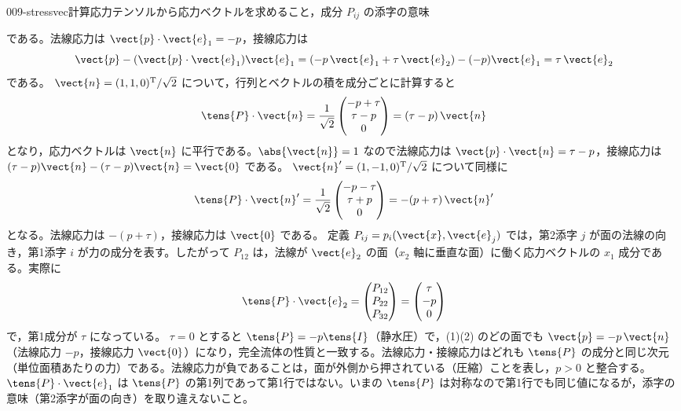 \documentclass[uplatex,dvipdfmx,a4paper,11pt]{jsarticle}
\begin{document}
\begin{mondai}{009-stressvec}{計算}{応力テンソルから応力ベクトルを求めること，成分 $P_{ij}$ の添字の意味}
\begin{tadashii}
である。法線応力は $\vect{p}\cdot\vect{e}_1=-p$，接線応力は
\[ \vect{p}-(\vect{p}\cdot\vect{e}_1)\vect{e}_1=(-p\,\vect{e}_1+\tau\,\vect{e}_2)-(-p)\vect{e}_1=\tau\,\vect{e}_2 \]
である。
 $\vect{n}=(1,1,0)^{\mathrm{T}}/\sqrt{2}$ について，行列とベクトルの積を成分ごとに計算すると
\[ \tens{P}\cdot\vect{n}=\frac{1}{\sqrt{2}}\begin{pmatrix}-p+\tau\\ \tau-p\\ 0\end{pmatrix}=(\tau-p)\,\vect{n} \]
となり，応力ベクトルは $\vect{n}$ に平行である。$\abs{\vect{n}}=1$ なので法線応力は $\vect{p}\cdot\vect{n}=\tau-p$，接線応力は $(\tau-p)\vect{n}-(\tau-p)\vect{n}=\vect{0}$ である。
$\vect{n}'=(1,-1,0)^{\mathrm{T}}/\sqrt{2}$ について同様に
\[ \tens{P}\cdot\vect{n}'=\frac{1}{\sqrt{2}}\begin{pmatrix}-p-\tau\\ \tau+p\\ 0\end{pmatrix}=-(p+\tau)\,\vect{n}' \]
となる。法線応力は $-(p+\tau)$，接線応力は $\vect{0}$ である。
 定義  $P_{ij}=p_i(\vect{x},\vect{e}_j)$ では，第2添字 $j$ が面の法線の向き，第1添字 $i$ が力の成分を表す。したがって $P_{12}$ は，法線が $\vect{e}_2$ の面（$x_2$ 軸に垂直な面）に働く応力ベクトルの $x_1$ 成分である。実際に
\[ \tens{P}\cdot\vect{e}_2=\begin{pmatrix}P_{12}\\ P_{22}\\ P_{32}\end{pmatrix}=\begin{pmatrix}\tau\\ -p\\ 0\end{pmatrix} \]
で，第1成分が $\tau$ になっている。
\kenzan $\tau=0$ とすると $\tens{P}=-p\tens{I}$（静水圧）で，(1)(2) のどの面でも $\vect{p}=-p\,\vect{n}$（法線応力 $-p$，接線応力 $\vect{0}$）になり，完全流体の性質と一致する。法線応力・接線応力はどれも $\tens{P}$ の成分と同じ次元（単位面積あたりの力）である。法線応力が負であることは，面が外側から押されている（圧縮）ことを表し，$p>0$ と整合する。
\tsumazuki $\tens{P}\cdot\vect{e}_1$ は $\tens{P}$ の第1列であって第1行ではない。いまの $\tens{P}$ は対称なので第1行でも同じ値になるが，添字の意味（第2添字が面の向き）を取り違えないこと。
\end{tadashii}
\end{mondai}
\end{document}
